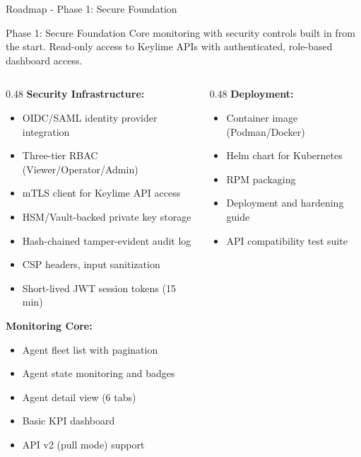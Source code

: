 \begin{frame}{Roadmap - Phase 1: Secure Foundation}
  \begin{block}{Phase 1: Secure Foundation}
    \scriptsize
    Core monitoring with security controls built in from the start. Read-only
    access to Keylime APIs with authenticated, role-based dashboard access.
  \end{block}

  \vspace{0.1cm}

  \scriptsize
  \begin{columns}[T]
    \begin{column}{0.48\textwidth}
      \textbf{Security Infrastructure:}
      \begin{itemize}
        \setlength{\itemsep}{0pt}
        \item OIDC/SAML identity provider integration
        \item Three-tier RBAC (Viewer/Operator/Admin)
        \item mTLS client for Keylime API access
        \item HSM/Vault-backed private key storage
        \item Hash-chained tamper-evident audit log
        \item CSP headers, input sanitization
        \item Short-lived JWT session tokens (15 min)
      \end{itemize}

      \vspace{0.1cm}

      \textbf{Monitoring Core:}
      \begin{itemize}
        \setlength{\itemsep}{0pt}
        \item Agent fleet list with pagination
        \item Agent state monitoring and badges
        \item Agent detail view (6 tabs)
        \item Basic KPI dashboard
        \item API v2 (pull mode) support
      \end{itemize}
    \end{column}
    \begin{column}{0.48\textwidth}
      \textbf{Deployment:}
      \begin{itemize}
        \setlength{\itemsep}{0pt}
        \item Container image (Podman/Docker)
        \item Helm chart for Kubernetes
        \item RPM packaging
        \item Deployment and hardening guide
        \item API compatibility test suite
      \end{itemize}


\end{column}
\end{columns}
\end{frame}
